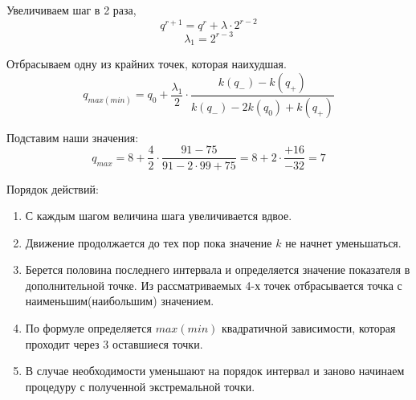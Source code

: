 \documentclass[12pt,a5paper]{scrbook}
\begin{document}
  Увеличиваем шаг в 2 раза,
  $$q^{r+1} = q^r + \lambda \cdot 2^{r-2}$$
  $$\lambda_1 = 2^{r-3}$$
  \par
  Отбрасываем одну из крайних точек, которая наихудшая.
  $$q_{max(min)} = q_0 + \frac{\lambda_1}{2} \cdot \frac{k(q_-) - k(q_+)}{k(q_-) - 2k(q_0) + k(q_+)}$$
  \par
  Подставим наши значения:
  $$q_{max} = 8 + \frac{4}{2} \cdot \frac{91 - 75}{91 - 2 \cdot 99 + 75} = 8 + 2 \cdot \frac{+16}{-32} = 7$$
  \par
  Порядок действий:
  \begin{enumerate}
    \item С каждым шагом величина шага увеличивается вдвое.
    \item Движение продолжается до тех пор пока значение $k$ не начнет уменьшаться.
    \item Берется половина последнего интервала и определяется значение показателя в дополнительной точке. Из рассматриваемых 4-х точек отбрасывается точка с наименьшим(наибольшим) значением.
    \item По формуле определяется $max(min)$ квадратичной зависимости, которая проходит через 3 оставшиеся точки.
    \item В случае необходимости уменьшают на порядок интервал и заново начинаем процедуру с полученной экстремальной точки.
  \end{enumerate}
\end{document}
